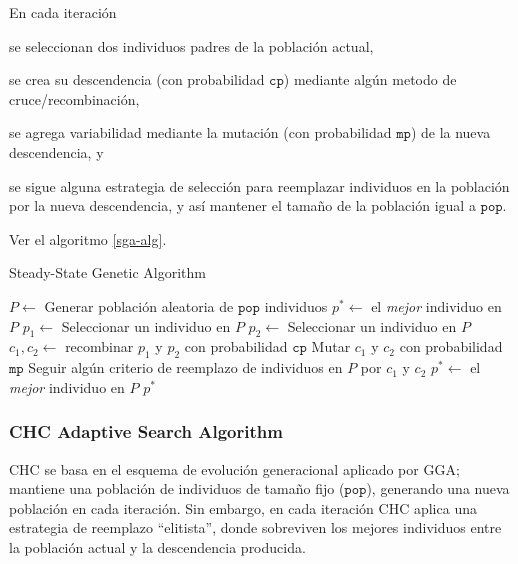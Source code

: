En cada iteración
\begin{inparaenum}
\item se seleccionan dos individuos padres de la población actual,
\item se crea su descendencia (con probabilidad $\texttt{cp}$) mediante algún metodo de cruce/recombinación,
\item se agrega variabilidad mediante la mutación (con probabilidad $\texttt{mp}$) de la nueva descendencia, y
\item se sigue alguna estrategia de selección para reemplazar individuos en la población por la nueva descendencia, y así mantener el tamaño de la población igual a $\texttt{pop}$.
\end{inparaenum}
Ver el algoritmo \ref{sga-alg}.

\begin{algorithm}
\caption{Steady-State Genetic Algorithm}
\label{sga-alg}
\begin{algorithmic}[1]


\State $P \gets$ Generar población aleatoria de $\texttt{pop}$ individuos
\State $p^{*} \gets $ el \emph{mejor} individuo en $P$
	\State $p_1 \gets$ Seleccionar un individuo en $P$
	\State $p_2 \gets$ Seleccionar un individuo en $P$
	\State $c_1, c_2 \gets $ recombinar $p_1$ y $p_2$ con probabilidad $\texttt{cp}$
	\State Mutar $c_1$ y $c_2$ con probabilidad $\texttt{mp}$
	\State Seguir algún criterio de reemplazo de individuos en $P$ por $c_1$ y $c_2$
		\State $p^{*} \gets$ el \emph{mejor} individuo en $P$
	\EndIf
\EndWhile
\State \Return $p^{*}$

\end{algorithmic}
\end{algorithm}

\subsubsection{CHC Adaptive Search Algorithm}

CHC \cite{eshelman1990chc} se basa en el esquema de evolución generacional aplicado por GGA; mantiene una población de individuos de tamaño fijo ($\texttt{pop}$), generando una nueva población en cada iteración. Sin embargo, en cada iteración CHC aplica una estrategia de reemplazo ``elitista'', donde sobreviven los mejores individuos entre la población actual y la descendencia producida.

